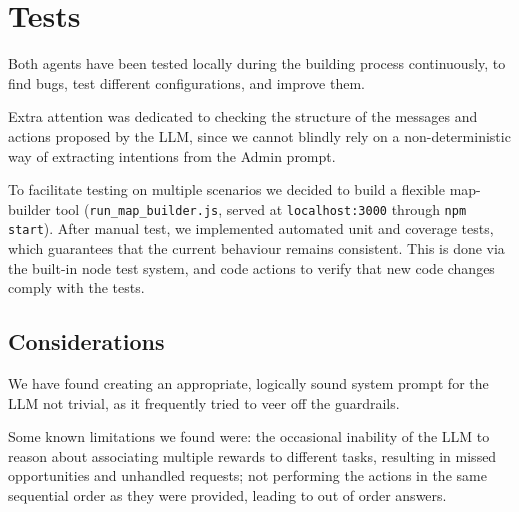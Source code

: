 \chapter{Tests}
\label{ch:tests}
Both agents have been tested locally during the building process continuously,
to find bugs, test different configurations, and improve them. 

Extra attention was dedicated to checking the structure of the messages and actions proposed by the LLM,
since we cannot blindly rely on a non-deterministic way of extracting intentions from the Admin prompt.

To facilitate testing on multiple scenarios we decided to build a flexible map-builder tool 
(\texttt{run\_map\_builder.js}, served at \texttt{localhost:3000} through \texttt{npm start}).
After manual test, we implemented automated unit and coverage tests, which guarantees that the 
current behaviour remains consistent.
This is done via the built-in node test system, and code actions to verify that new code changes 
comply with the tests.


\section{Considerations}
\label{sub:res_and_lim}
We have found creating an appropriate, logically sound system prompt for the LLM not trivial, 
as it frequently tried to veer off the guardrails.

Some known limitations we found were: the occasional inability of the LLM to reason about associating 
multiple rewards to different tasks, resulting in missed opportunities and unhandled requests; not performing
the actions in the same sequential order as they were provided, leading to out of order answers.